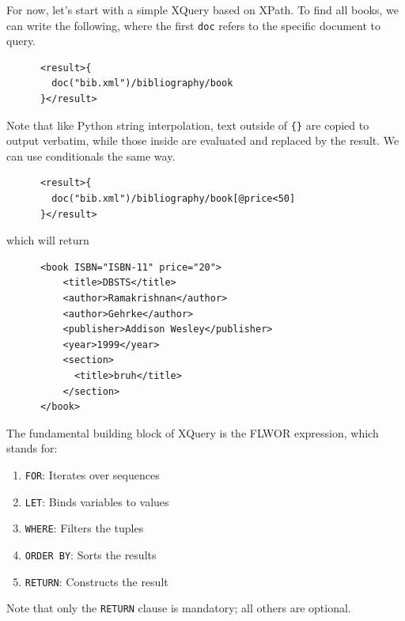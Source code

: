   \begin{example}
    For now, let's start with a simple XQuery based on XPath. To find all books, we can write the following, where the first \texttt{doc} refers to the specific document to query.
    \begin{lstlisting}
      <result>{
        doc("bib.xml")/bibliography/book
      }</result>
    \end{lstlisting}
    Note that like Python string interpolation, text outside of \texttt{\{\}} are copied to output verbatim, while those inside are evaluated and replaced by the result. We can use conditionals the same way. 
    \begin{lstlisting}
      <result>{
        doc("bib.xml")/bibliography/book[@price<50]
      }</result>
    \end{lstlisting}
    which will return 
    \begin{lstlisting}
      <book ISBN="ISBN-11" price="20">
          <title>DBSTS</title>
          <author>Ramakrishnan</author>
          <author>Gehrke</author>
          <publisher>Addison Wesley</publisher>
          <year>1999</year>
          <section>
            <title>bruh</title>
          </section>
      </book>
    \end{lstlisting}
  \end{example}

  \begin{definition}
    The fundamental building block of XQuery is the FLWOR expression, which stands for:
    \begin{enumerate}
      \item \texttt{FOR}: Iterates over sequences
      \item \texttt{LET}: Binds variables to values
      \item \texttt{WHERE}: Filters the tuples
      \item \texttt{ORDER BY}: Sorts the results
      \item \texttt{RETURN}: Constructs the result
    \end{enumerate}
    Note that only the \texttt{RETURN} clause is mandatory; all others are optional.
  \end{definition}

